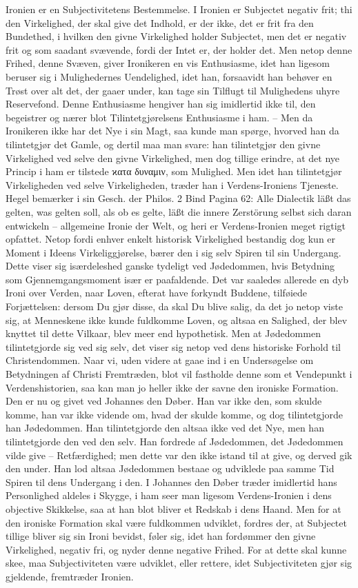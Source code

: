 \documentclass[12pt,a4paper]{article}
\begin{document}
Ironien er en Subjectivitetens Bestemmelse. I Ironien er Subjectet negativ frit; thi den Virkelighed, der skal give det Indhold, er der ikke, det er frit fra den Bundethed, i hvilken den givne Virkelighed holder Subjectet, men det er negativ frit og som saadant svævende, fordi der Intet er, der holder det. Men netop denne Frihed, denne Svæven, giver Ironikeren en vis Enthusiasme, idet han ligesom beruser sig i Mulighedernes Uendelighed, idet han, forsaavidt han behøver en Trøst over alt det, der gaaer under, kan tage sin Tilflugt til Mulighedens uhyre Reservefond. Denne Enthusiasme hengiver han sig imidlertid ikke til, den begeistrer og nærer blot Tilintetgjørelsens Enthusiasme i ham. – Men da Ironikeren ikke har det Nye i sin Magt, saa kunde man spørge, hvorved han da tilintetgjør det Gamle, og dertil maa man svare: han tilintetgjør den givne Virkelighed ved selve den givne Virkelighed, men dog tillige erindre, at det nye Princip i ham er tilstede ϰατα δυναμιν, som Mulighed. Men idet han tilintetgjør Virkeligheden ved selve Virkeligheden, træder han i Verdens-Ironiens Tjeneste. Hegel bemærker i sin Gesch. der Philos. 2 Bind Pagina 62: Alle Dialectik läßt das gelten, was gelten soll, als ob es gelte, läßt die innere Zerstörung selbst sich daran entwickeln – allgemeine Ironie der Welt, og heri er Verdens-Ironien meget rigtigt opfattet. Netop fordi enhver enkelt historisk Virkelighed bestandig dog kun er Moment i Ideens Virkeliggjørelse, bærer den i sig selv Spiren til sin Undergang. Dette viser sig isærdeleshed ganske tydeligt ved Jødedommen, hvis Betydning som Gjennemgangsmoment især er paafaldende. Det var saaledes allerede en dyb Ironi over Verden, naar Loven, efterat have forkyndt Buddene, tilføiede Forjættelsen: dersom Du gjør disse, da skal Du blive salig, da det jo netop viste sig, at Menneskene ikke kunde fuldkomme Loven, og altsaa en Salighed, der blev knyttet til dette Vilkaar, blev meer end hypothetisk. Men at Jødedommen tilintetgjorde sig ved sig selv, det viser sig netop ved dens historiske Forhold til Christendommen. Naar vi, uden videre at gaae ind i en Undersøgelse om Betydningen af Christi Fremtræden, blot vil fastholde denne som et Vendepunkt i Verdenshistorien, saa kan man jo heller ikke der savne den ironiske Formation. Den er nu og givet ved Johannes den Døber. Han var ikke den, som skulde komme, han var ikke vidende om, hvad der skulde komme, og dog tilintetgjorde han Jødedommen. Han tilintetgjorde den altsaa ikke ved det Nye, men han tilintetgjorde den ved den selv. Han fordrede af Jødedommen, det Jødedommen vilde give – Retfærdighed; men dette var den ikke istand til at give, og derved gik den under. Han lod altsaa Jødedommen bestaae og udviklede paa samme Tid Spiren til dens Undergang i den. I Johannes den Døber træder imidlertid hans Personlighed aldeles i Skygge, i ham seer man ligesom Verdens-Ironien i dens objective Skikkelse, saa at han blot bliver et Redskab i dens Haand. Men for at den ironiske Formation skal være fuldkommen udviklet, fordres der, at Subjectet tillige bliver sig sin Ironi bevidst, føler sig, idet han fordømmer den givne Virkelighed, negativ fri, og nyder denne negative Frihed. For at dette skal kunne skee, maa Subjectiviteten være udviklet, eller rettere, idet Subjectiviteten gjør sig gjeldende, fremtræder Ironien. 
\end{document}
